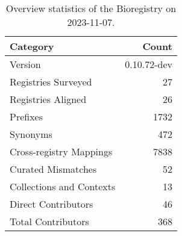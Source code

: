 \begin{table}
\caption{Overview statistics of the Bioregistry on 2023-11-07.}
\label{tab:bioregistry-summary}
\begin{tabular}{lr}
\toprule
Category & Count \\
\midrule
Version & 0.10.72-dev \\
Registries Surveyed & 27 \\
Registries Aligned & 26 \\
Prefixes & 1732 \\
Synonyms & 472 \\
Cross-registry Mappings & 7838 \\
Curated Mismatches & 52 \\
Collections and Contexts & 13 \\
Direct Contributors & 46 \\
Total Contributors & 368 \\
\bottomrule
\end{tabular}
\end{table}
